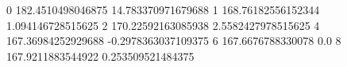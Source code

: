 0 182.4510498046875 14.783370971679688
1 168.76182556152344 1.094146728515625
2 170.22592163085938 2.5582427978515625
4 167.36984252929688 -0.2978363037109375
6 167.6676788330078 0.0
8 167.9211883544922 0.253509521484375
